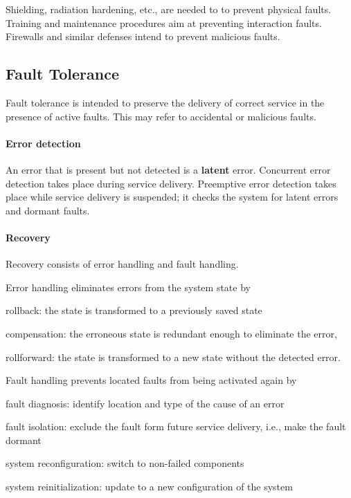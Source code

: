 Shielding, radiation hardening, etc., are needed to to prevent physical faults.
Training and maintenance procedures aim at preventing interaction faults.
Firewalls and similar defenses intend to prevent malicious faults.

\subsection{Fault Tolerance}

Fault tolerance is intended to preserve the delivery of correct service in the presence of active faults.
This may refer to accidental or malicious faults.

\paragraph{Error detection}
An error that is present but not detected is a \textbf{latent} error. 
Concurrent error detection takes place during service delivery.
Preemptive error detection takes place while service delivery is suspended; it checks the
system for latent errors and dormant faults.

\paragraph{Recovery}
Recovery consists of error handling and fault handling.

Error handling eliminates errors from the system state by
\begin{compactitem}
  \item rollback: the state is transformed to a previously saved state
  \item compensation: the erroneous state is redundant enough to eliminate the error,
  \item rollforward: the state is transformed to a new state without the detected error.
\end{compactitem}

Fault handling prevents located faults from being activated again by
\begin{compactitem}
  \item fault diagnosis: identify location and type of the cause of an error
  \item fault isolation: exclude the fault form future service delivery, i.e., make the fault dormant
  \item system reconfiguration: switch to non-failed components
  \item system reinitialization: update to a new configuration of the system
\end{compactitem}

